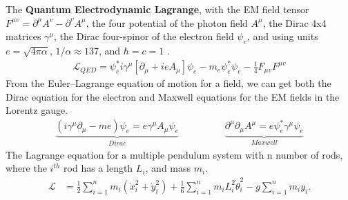 The \textbf{Quantum Electrodynamic Lagrange}, with the EM field tensor $F^{\mu v} = \partial ^\mu A^v - \partial^vA^\mu$, the four potential of the photon field $A^\mu$, the Dirac 4x4 matrices $\gamma^\mu$, the Dirac four-spinor of the electron field $\psi_e$, and using units $e=\sqrt{4\pi\alpha}$, $1/\alpha \approx 137$, and $\hbar=c=1$ \cite{Nazarewicz_PHY802}.
\begin{align}
	\mathcal{L}_{QED} = \psi_e^*i\gamma^\mu[\partial_\mu+ieA_\mu]\psi_e-m_e\psi_e^*\psi_e-\frac{1}{4}F_{\mu v}F^{\mu v}
\end{align}
From the Euler–Lagrange equation of motion for a field, we can get both the Dirac equation for the electron and Maxwell equations for the EM fields 
in the Lorentz gauge.
\begin{align}
	\underbrace{(i\gamma^\mu\partial_\mu-me)\psi_e=e\gamma^\mu A_\mu\psi_e}_{Dirac} \hspace{2cm} \underbrace{\partial^\mu\partial_\mu A^\mu = e\psi_e^*\gamma^\mu\psi_e}_{Maxwell}
\end{align}
The Lagrange equation for a multiple pendulum system with n number of rods, where the $i^{th}$ rod has a length $L_i$, and mass $m_i$.
\begin{align}
\mathcal{L}&=\frac{1}{2}\sum_{i=1}^{n}m_i(\dot{x}^2_i+\dot{y}^2_i)+\frac{1}{6}\sum_{i=1}^{n}m_iL_i^2\dot{\theta}_i^2-g\sum_{i=1}^{n}m_iy_i.
\end{align}



